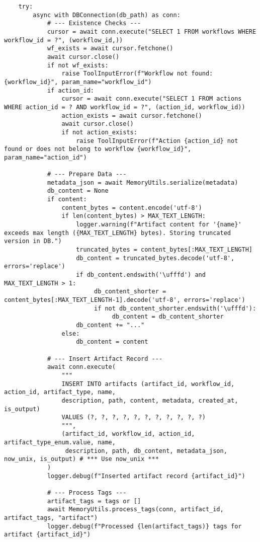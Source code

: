 \documentclass[12pt,a4paper]{article}
\begin{document}
\begin{pageablecode}
\begin{verbatim}
    try:
        async with DBConnection(db_path) as conn:
            # --- Existence Checks ---
            cursor = await conn.execute("SELECT 1 FROM workflows WHERE workflow_id = ?", (workflow_id,))
            wf_exists = await cursor.fetchone()
            await cursor.close()
            if not wf_exists:
                raise ToolInputError(f"Workflow not found: {workflow_id}", param_name="workflow_id")
            if action_id:
                cursor = await conn.execute("SELECT 1 FROM actions WHERE action_id = ? AND workflow_id = ?", (action_id, workflow_id))
                action_exists = await cursor.fetchone()
                await cursor.close()
                if not action_exists:
                    raise ToolInputError(f"Action {action_id} not found or does not belong to workflow {workflow_id}", param_name="action_id")

            # --- Prepare Data ---
            metadata_json = await MemoryUtils.serialize(metadata)
            db_content = None
            if content:
                content_bytes = content.encode('utf-8')
                if len(content_bytes) > MAX_TEXT_LENGTH:
                    logger.warning(f"Artifact content for '{name}' exceeds max length ({MAX_TEXT_LENGTH} bytes). Storing truncated version in DB.")
                    truncated_bytes = content_bytes[:MAX_TEXT_LENGTH]
                    db_content = truncated_bytes.decode('utf-8', errors='replace')
                    if db_content.endswith('\ufffd') and MAX_TEXT_LENGTH > 1:
                         db_content_shorter = content_bytes[:MAX_TEXT_LENGTH-1].decode('utf-8', errors='replace')
                         if not db_content_shorter.endswith('\ufffd'):
                              db_content = db_content_shorter
                    db_content += "..."
                else:
                    db_content = content

            # --- Insert Artifact Record ---
            await conn.execute(
                """
                INSERT INTO artifacts (artifact_id, workflow_id, action_id, artifact_type, name,
                description, path, content, metadata, created_at, is_output)
                VALUES (?, ?, ?, ?, ?, ?, ?, ?, ?, ?, ?)
                """,
                (artifact_id, workflow_id, action_id, artifact_type_enum.value, name,
                 description, path, db_content, metadata_json, now_unix, is_output) # *** Use now_unix ***
            )
            logger.debug(f"Inserted artifact record {artifact_id}")

            # --- Process Tags ---
            artifact_tags = tags or []
            await MemoryUtils.process_tags(conn, artifact_id, artifact_tags, "artifact")
            logger.debug(f"Processed {len(artifact_tags)} tags for artifact {artifact_id}")


\end{verbatim}
\end{pageablecode}
\end{document}
